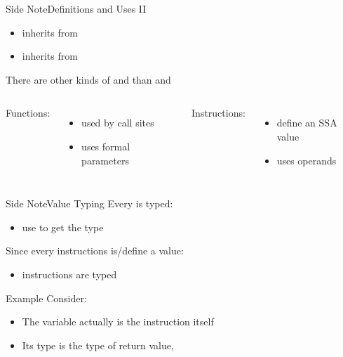 \begin{frame}{Side Note}{Definitions and Uses II}

\begin{itemize}
\item {} inherits from 
\item {} inherits from 
\end{itemize}

\vfill
There are other kinds of  and  than
 and 

\vfill
\begin{columns}[t]
Functions:

\begin{itemize}
\item used by call sites
\item uses formal parameters
\end{itemize}

Instructions:

\begin{itemize}
\item define an SSA value
\item uses operands
\end{itemize}
\end{columns}
\end{frame}


\begin{frame}{Side Note}{Value Typing}
Every  is typed:

\begin{itemize}
\item use  to get the type
\end{itemize}

\vfill
Since every instructions is/define a value:

\begin{itemize}
\item instructions are typed
\end{itemize}

\vfill
\begin{block}{Example}
Consider:

\centering
{}

\flushleft
\begin{itemize}
\item The  variable actually is the instruction itself
\item Its type is the type of  return value, 
\end{itemize}
\end{block}
\end{frame}



